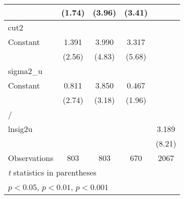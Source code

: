 {\begin{tabular}{l*{4}{c}}
                    &      (1.74)         &      (3.96)         &      (3.41)         &                     \\
\hline
cut2                &                     &                     &                     &                     \\
Constant            &       1.391\sym{*}  &       3.990\sym{***}&       3.317\sym{***}&                     \\
                    &      (2.56)         &      (4.83)         &      (5.68)         &                     \\
\hline
sigma2\_u            &                     &                     &                     &                     \\
Constant            &       0.811\sym{**} &       3.850\sym{**} &       0.467         &                     \\
                    &      (2.74)         &      (3.18)         &      (1.96)         &                     \\
\hline
/                   &                     &                     &                     &                     \\
lnsig2u             &                     &                     &                     &       3.189\sym{***}\\
                    &                     &                     &                     &      (8.21)         \\
\hline
Observations        &         803         &         803         &         670         &        2067         \\
\hline\hline
\multicolumn{5}{l}{\footnotesize \textit{t} statistics in parentheses}\\
\multicolumn{5}{l}{\footnotesize \sym{*} \(p<0.05\), \sym{**} \(p<0.01\), \sym{***} \(p<0.001\)}\\
\end{tabular}
}
